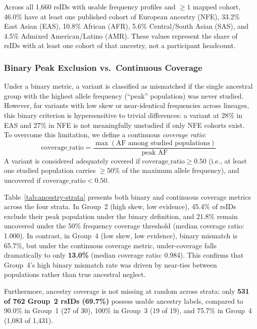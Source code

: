 \documentclass[conference]{IEEEtran}
\begin{document}
\begin{table}[!t]
Across all 1,660 rsIDs with usable frequency profiles and $\ge 1$ mapped cohort, 46.0\% have at least one published cohort of European ancestry (NFE), 33.2\% East Asian (EAS), 10.8\% African (AFR), 5.6\% Central/South Asian (SAS), and 4.5\% Admixed American/Latino (AMR).
These values represent the share of rsIDs with at least one cohort of that ancestry, not a participant headcount.

\subsubsection{Binary Peak Exclusion vs.\ Continuous Coverage}
Under a binary metric, a variant is classified as mismatched if the single ancestral group with the highest allele frequency (``peak'' population) was never studied.
However, for variants with low skew or near-identical frequencies across lineages, this binary criterion is hypersensitive to trivial differences: a variant at 28\% in EAS and 27\% in NFE is not meaningfully unstudied if only NFE cohorts exist.
To overcome this limitation, we define a continuous \emph{coverage ratio}:
\begin{equation}
\text{coverage\_ratio} = \frac{\max(\text{AF among studied populations})}{\text{peak AF}}
\end{equation}
A variant is considered adequately covered if $\text{coverage\_ratio} \ge 0.50$ (i.e., at least one studied population carries $\ge 50\%$ of the maximum allele frequency), and uncovered if $\text{coverage\_ratio} < 0.50$.

Table~\ref{tab:ancestry-strata} presents both binary and continuous coverage metrics across the four strata.
In Group~2 (high skew, low evidence), 45.4\% of rsIDs exclude their peak population under the binary definition, and 21.8\% remain uncovered under the 50\% frequency coverage threshold (median coverage ratio: 1.000).
In contrast, in Group~4 (low skew, low evidence), binary mismatch is 65.7\%, but under the continuous coverage metric, under-coverage falls dramatically to only \textbf{13.0\%} (median coverage ratio: 0.984).
This confirms that Group~4's high binary mismatch rate was driven by near-ties between populations rather than true ancestral neglect.

Furthermore, ancestry coverage is not missing at random across strata: only \textbf{531 of 762 Group~2 rsIDs (69.7\%)} possess usable ancestry labels, compared to 90.0\% in Group~1 (27 of 30), 100\% in Group~3 (19 of 19), and 75.7\% in Group~4 (1,083 of 1,431).


\end{table}
\end{document}
